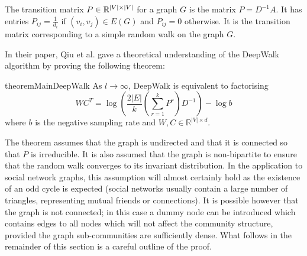 \documentclass[a4paper]{article}
\begin{document}
\begin{definition}
  The transition matrix $P \in \R^{|V| \times |V|}$ for a graph $G$ is the
  matrix $P = D^{-1}A$. It has entries $P_{ij} = \frac{1}{d_i}$ if $(v_i, v_j)
  \in E(G)$ and $P_{ij} = 0$ otherwise. It is the transition matrix
  corresponding to a simple random walk on the graph $G$. 
\end{definition}
In their paper, Qiu et al. gave a theoretical understanding of the DeepWalk
algorithm by proving the following theorem:
\begin{restatable}{theorem}{MainDeepWalk}
  As $l \to \infty$, DeepWalk is equivalent to factorising
  \[WC^T = \log{\left(\frac{2|E|}{k}\left( \sum_{r = 1}^k P^r  \right) D^{-1}
      \right)} - \log{b}\]
  where $b$ is the negative sampling rate and $W, C \in \mathbb{R}^{|V| \times d}$.
\end{restatable}
\noindent The theorem assumes that the graph is undirected and that it is connected so
that $P$ is irreducible. It is also assumed that the graph is
non-bipartite to ensure that the random walk converges to its invariant distribution. In the application to
social network graphs, this
assumption will almost certainly hold as the existence of an odd cycle is
expected (social networks usually contain a large number of triangles,
representing mutual friends or connections). It is possible however that the
graph is not connected; in this case a dummy node can be introduced which
contains edges to all nodes which will not affect the community structure,
provided the graph sub-communities are sufficiently dense.
What follows in the remainder of this section is a careful outline of the proof.
\end{document}

